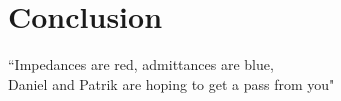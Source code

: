 \documentclass[report.tex]{subfiles}
\begin{document}
\pagebreak \section{Conclusion}
``Impedances are red, admittances are blue,\\
Daniel and Patrik are hoping to get a pass from you"
\end{document}
